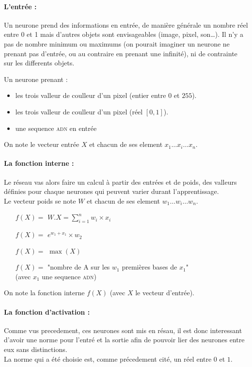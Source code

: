 \paragraph{L'entrée :}
Un neurone prend des informations en entrée, de manière générale un nombre réel entre 0 et 1
mais d'autres objets sont envisageables (image, pixel, son\ldots).
Il n'y a pas de nombre minimum ou maximums
(on pourait imaginer un neurone ne prenant pas d'entrée, ou au contraire en prenant une infinité),
ni de contrainte sur les differents objets.
\exemle
{
Un neurone prenant :
\begin{itemize}
    \item les trois valleur de coulleur d'un pixel (entier entre $0$ et $255$).
    \item les trois valleur de coulleur d'un pixel (réel $[0, 1]$).
    \item une sequence \textsc{adn} en entrée

\end{itemize}
}
On note le vecteur entrée $X$ et chacun de ses element $x_1 \ldots x_i \ldots x_n$.

\paragraph{La fonction interne :}
Le réseau vas alors faire un calcul à partir des entrées et de poids,
des valleurs définies pour chaque neurones qui peuvent varier durant l'apprentissage. \\
Le vecteur poids se note $W$ et chacun de ses element $w_1 \ldots w_i \ldots w_n$.

\exemle
{
\begin{itemize}
    \item[$f(X) =$] $W.X = \sum_{i=1}^{n} w_i \times x_i $
    \item[$f(X) =$] $e^{w_1 + x_1} \times w_2$
    \item[$f(X) =$] $\max(X)$
    \item[$f(X) =$] "nombre de A sur les $w_1$ premières bases de $x_1$" \\
            (avec $x_1$ une sequence \textsc{adn})
\end{itemize}
}
On note la fonction interne $f(X)$ (avec $X$ le vecteur d'entrée).

\paragraph{La fonction d'activation :}
Comme vus precedement, ces neurones sont mis en résau,
il est donc interessant d'avoir une norme pour l'entré et la sortie
afin de pouvoir lier des neurones entre eux sans distinctions. \\
La norme qui a été choisie est, comme précedement cité, un réel entre $0$ et $1$.


